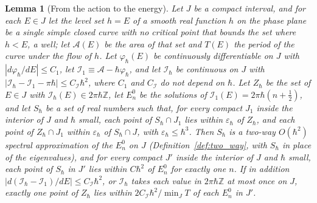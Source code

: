 \documentclass[aps,prd,onecolumn,tightenlines,nofootinbib,notitlepage,11pt,floatfix]{revtex4-2}
\theoremstyle{indentedtheorem}
\newtheorem{lemma}{Lemma}
\begin{document}
\begin{lemma}[From the action to the energy]\label{lem:levels_action}
Let $J$ be a compact interval, and for each $E\in J$ let the level set $h=E$ of a smooth real function $h$ on the phase plane be a single simple closed curve with no critical point that bounds the set where $h<E$, a well; let $\mathcal{A}(E)$ be the area of that set and $T(E)$ the period of the curve under the flow of $h$. Let $\varphi_\hbar(E)$ be continuously differentiable on $J$ with $|d\varphi_\hbar/dE|\leq C_1$, let $\mathcal{I}_1\equiv\mathcal{A}-\hbar\varphi_\hbar$, and let $\mathcal{I}_\hbar$ be continuous on $J$ with $|\mathcal{I}_\hbar-\mathcal{I}_1-\pi\hbar|\leq C_\mathcal{I}\hbar^2$, where $C_1$ and $C_\mathcal{I}$ do not depend on $\hbar$. Let $Z_\hbar$ be the set of $E\in J$ with $\mathcal{I}_\hbar(E)\in2\pi\hbar\mathbb{Z}$, let $E_n^0$ be the solutions of $\mathcal{I}_1(E)=2\pi\hbar(n+\tfrac{1}{2})$, and let $S_\hbar$ be a set of real numbers such that, for every compact $J_1$ inside the interior of $J$ and $\hbar$ small, each point of $S_\hbar\cap J_1$ lies within $\varepsilon_\hbar$ of $Z_\hbar$, and each point of $Z_\hbar\cap J_1$ within $\varepsilon_\hbar$ of $S_\hbar\cap J$, with $\varepsilon_\hbar\leq\hbar^3$. Then $S_\hbar$ is a two-way $O(\hbar^2)$ spectral approximation of the $E_n^0$ on $J$ (Definition~\ref{def:two_way}, with $S_\hbar$ in place of the eigenvalues), and for every compact $J'$ inside the interior of $J$ and $\hbar$ small, each point of $S_\hbar$ in $J'$ lies within $C\hbar^2$ of $E_n^0$ for exactly one $n$. If in addition $|d(\mathcal{I}_\hbar-\mathcal{I}_1)/dE|\leq C_\mathcal{I}\hbar^2$, or $\mathcal{I}_\hbar$ takes each value in $2\pi\hbar\mathbb{Z}$ at most once on $J$, exactly one point of $Z_\hbar$ lies within $2C_\mathcal{I}\hbar^2/\min_JT$ of each $E_n^0$ in $J'$.
\end{lemma}
\end{document}
